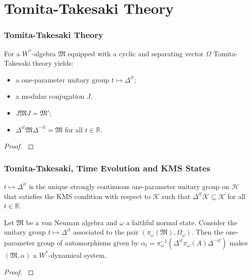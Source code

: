 \documentclass{beamer}
\begin{document}
\section{Tomita-Takesaki Theory}

\begin{frame}
	\frametitle{Tomita-Takesaki Theory}
	For a $W^*$-algebra $\mathfrak{M}$ equipped with a cyclic and separating vector $\Omega$ Tomita-Takesaki theory yields:
	\begin{itemize}
		\item a one-parameter unitary group $t\mapsto\Delta^{it}$;
		\item a modular conjugation $J$.
	\end{itemize}
	\begin{theorem}
		\begin{itemize}
			\item $J\mathfrak{M}J=\mathfrak{M}'$;
			\item $\Delta^{it}\mathfrak{M}\Delta^{-it}=\mathfrak{M}$ for all $t\in\mathbb{R}$. 	
		\end{itemize}
	\end{theorem}
	\begin{proof}
		\cite{Duvenhage1999}
	\end{proof}
\end{frame}

\begin{frame}
	\frametitle{Tomita-Takesaki, Time Evolution and KMS States}
	\begin{theorem}[$\bigstar$]
		$t\mapsto\Delta^{it}$ is the unique strongly continuous one-parameter unitary group on $\mathcal{H}$ that satisfies the KMS condition with respect to $\mathcal{K}$ such that $\Delta^{it}\mathcal{K}\subseteq\mathcal{K}$ for all $t\in\mathbb{R}$.
	\end{theorem}
	\begin{theorem}[$\bigstar$]
		Let $\mathfrak{M}$ be a von Neuman algebra and $\omega$ a faithful normal state. Consider the unitary group $t\mapsto\Delta^{it}$ associated to the pair $(\pi_\omega(\mathfrak{M}),\Omega_\omega)$. Then the one-parameter group of automorphisms given by $\alpha_t = \pi_\omega^{-1}(\Delta^{it}\pi_\omega(A)\Delta^{-it})$ makes $(\mathfrak{M},\alpha)$ a $W^*$-dynamical system.
	\end{theorem}
	\begin{proof}
		\cite{Duvenhage1999}
	\end{proof}
\end{frame}
\end{document}
